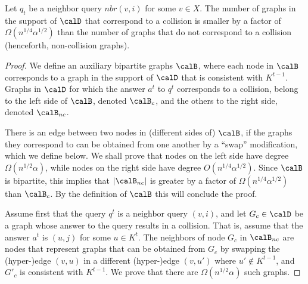 \iffalse
\begin{claim}
    Let $q_t$ be a neighbor query $nbr(v,i)$ for some $v\in X$.
    The number of graphs in the support of $\calD$ that correspond to a collision is smaller by a factor of $\Omega(n^{1/4}\alpha^{1/2})$ than the number of graphs that do not correspond to a collision (henceforth, non-collision graphs).
\end{claim}
\begin{proof}
    We define an  auxiliary bipartite  graphs $\calB$, where each node in $\calB$ corresponds to a graph in the support of $\calD$ that is consistent with $K^{t-1}$.
   Graphs in $\calD$ for which the answer $a^t$ to $q^t$ corresponds to a collision, belong to the left side of $\calB$, denoted $\calB_{c}$, and the others to the right side, denoted $\calB_{nc}$.


    There is an edge between two nodes in (different sides of) $\calB$, if the graphs they correspond to can be obtained from one another by a ``swap'' modification, which we define below.
    We shall prove that nodes  on the left side have degree $\Omega(n^{1/2}\alpha)$, while nodes on the right side have degree $O(n^{1/4}\alpha^{1/2})$. Since $\calB$ is bipartite, this implies that $|\calB_{nc}|$ is greater by a factor of $\Omega(n^{1/4}\alpha^{1/2})$ than $\calB_{c}$. By the definition of $\calB$ this will conclude the proof.

    Assume first that the query $q^t$ is a neighbor query $(v,i)$, and let $G_{c} \in \calD$ be a graph whose answer to the query results in a collision. That is, assume that the answer $a^t$ is $(u,j)$ for some $u\in K^t$. The neighbors of node $G_{c}$ in $\calB_{nc}$ are nodes that represent graphs that can be obtained from $G_{c}$ by swapping the (hyper-)edge $(v,u)$ in a different (hyper-)edge $(v, u')$ where $u'\notin K^{t-1}$, and  $G'_{c}$ is consistent with $K^{t-1}$. We prove that there are $\Omega(n^{1/2}\alpha)$ such graphs.


\end{proof}
